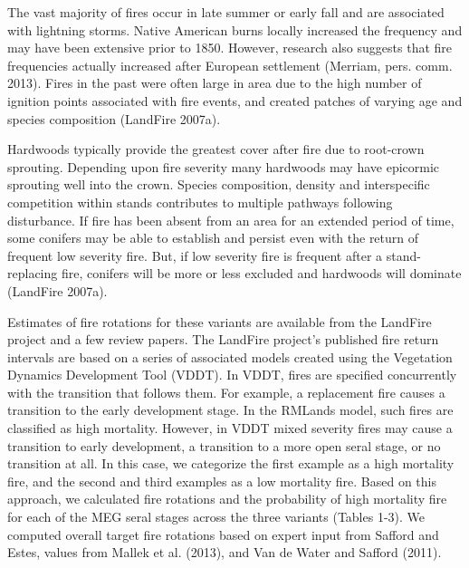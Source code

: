 The vast majority of fires occur in late summer or early fall and are associated with lightning storms. Native American burns locally increased the frequency and may have been extensive prior to 1850. However, research also suggests that fire frequencies actually increased after European settlement (Merriam, pers. comm. 2013). Fires in the past were often large in area due to the high number of ignition points associated with fire events, and created patches of varying age and species composition (LandFire 2007a). 

Hardwoods typically provide the greatest cover after fire due to root-crown sprouting. Depending upon fire severity many hardwoods may have epicormic sprouting well into the crown. Species composition, density and interspecific competition within stands contributes to multiple pathways following disturbance. If fire has been absent from an area for an extended period of time, some conifers may be able to establish and persist even with the return of frequent low severity fire. But, if low severity fire is frequent after a stand-replacing fire, conifers will be more or less excluded and hardwoods will dominate (LandFire 2007a).

Estimates of fire rotations for these variants are available from the LandFire project and a few review papers. The LandFire project’s published fire return intervals are based on a series of associated models created using the Vegetation Dynamics Development Tool (VDDT). In VDDT, fires are specified concurrently with the transition that follows them. For example, a replacement fire causes a transition to the early development stage. In the RMLands model, such fires are classified as high mortality. However, in VDDT mixed severity fires may cause a transition to early development, a transition to a more open seral stage, or no transition at all. In this case, we categorize the first example as a high mortality fire, and the second and third examples as a low mortality fire. Based on this approach, we calculated fire rotations and the probability of high mortality fire for each of the MEG seral stages across the three variants (Tables 1-3). We computed overall target fire rotations based on expert input from Safford and Estes, values from Mallek et al. (2013), and Van de Water and Safford (2011). 

